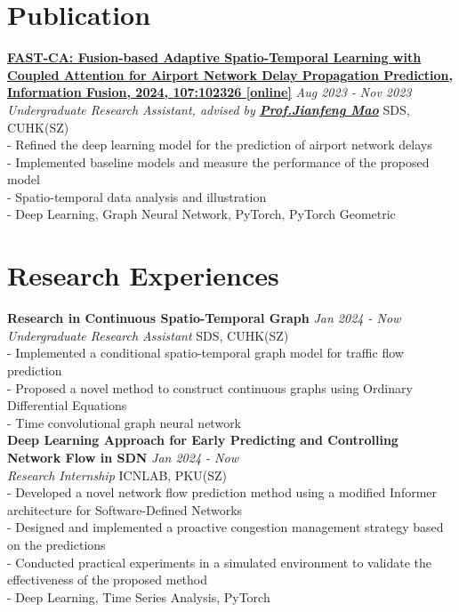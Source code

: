 \documentclass[a4paper,10pt]{article}
\begin{document}
\section*{Publication}
\href{https://www.sciencedirect.com/science/article/pii/S1566253524001040}{\textbf{FAST-CA: Fusion-based Adaptive Spatio-Temporal Learning with Coupled Attention for Airport Network Delay Propagation Prediction, Information Fusion, 2024, 107:102326 [online]}} \hfill \textit{Aug 2023 - Nov 2023}\\
\textit{Undergraduate Research Assistant, advised by \textbf{\href{https://sds.cuhk.edu.cn/en/teacher/268}{Prof.\@ Jianfeng Mao}}} \hfill SDS, CUHK(SZ)\\
- Refined the deep learning model for the prediction of airport network delays\\
- Implemented baseline models and measure the performance of the proposed model\\
- Spatio-temporal data analysis and illustration\\
- Deep Learning, Graph Neural Network, PyTorch, PyTorch Geometric
\section*{Research Experiences}
\textbf{Research in Continuous Spatio-Temporal Graph} \hfill \textit{Jan 2024 - Now}\\
\textit{Undergraduate Research Assistant} \hfill SDS, CUHK(SZ)\\
- Implemented a conditional spatio-temporal graph model for traffic flow prediction\\
- Proposed a novel method to construct continuous graphs using Ordinary Differential Equations\\
- Time convolutional graph neural network\\
\textbf{Deep Learning Approach for Early Predicting and Controlling Network Flow in SDN} \hfill \textit{Jan 2024 - Now}\\
\textit{Research Internship} \hfill ICNLAB, PKU(SZ)\\
- Developed a novel network flow prediction method using a modified Informer architecture for Software-Defined Networks\\
- Designed and implemented a proactive congestion management strategy based on the predictions\\
- Conducted practical experiments in a simulated environment to validate the effectiveness of the proposed method\\
- Deep Learning, Time Series Analysis, PyTorch
\end{document}
